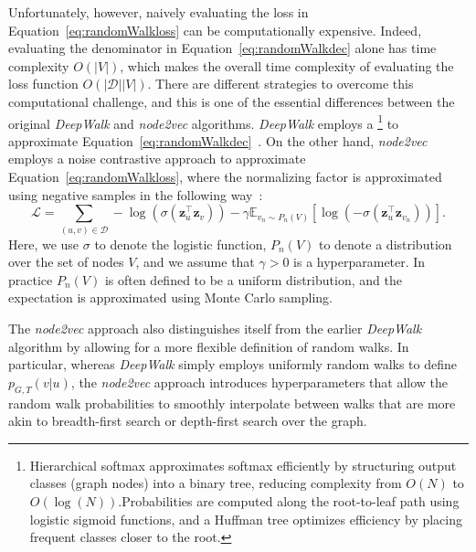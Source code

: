 Unfortunately, however, naively evaluating the loss in Equation~\eqref{eq:randomWalkloss} can be computationally expensive. Indeed, evaluating the denominator in Equation~\eqref{eq:randomWalkdec} alone has time complexity $O(|V|)$, which makes the overall time complexity of evaluating the loss function $O(|\mathcal{D}||V|)$. There are different strategies to overcome this computational challenge, and this is one of the essential differences between the original \textit{DeepWalk} and \textit{node2vec} algorithms. \textit{DeepWalk} employs a \footnote{Hierarchical softmax approximates softmax efficiently by structuring output classes (graph nodes) into a binary tree, reducing complexity from $O(N)$ to $O(\log(N))$.Probabilities are computed along the root-to-leaf path using logistic sigmoid functions, and a Huffman tree optimizes efficiency by placing frequent classes closer to the root.} to approximate Equation~\eqref{eq:randomWalkdec}~\cite{Perozzi2014DeepWalk}. On the other hand, \textit{node2vec} employs a noise contrastive approach to approximate Equation~\eqref{eq:randomWalkloss}, where the normalizing factor is approximated using negative samples in the following way~\cite{Grover2016node2vec}:
\begin{equation}\label{eq:node2vecLoss}
    \mathcal{L} = \sum_{(u,v)\in\mathcal{D}} -\log(\sigma(\mathbf{z}_u^\top\mathbf{z}_v)) - \gamma\mathbb{E}_{v_n\sim P_n(V)}[\log(-\sigma(\mathbf{z}_u^\top\mathbf{z}_{v_n}))].
\end{equation}
Here, we use $\sigma$ to denote the logistic function, $P_n(V)$ to denote a distribution over the set of nodes $V$, and we assume that $\gamma > 0$ is a hyperparameter. In practice $P_n(V)$ is often defined to be a uniform distribution, and the expectation is approximated using Monte Carlo sampling.

The \textit{node2vec} approach also distinguishes itself from the earlier \textit{DeepWalk} algorithm by allowing for a more flexible definition of random walks. In particular, whereas \textit{DeepWalk} simply employs uniformly random walks to define $p_{G,T}(v|u)$, the \textit{node2vec} approach introduces hyperparameters that allow the random walk probabilities to smoothly interpolate between walks that are more akin to breadth-first search or depth-first search over the graph.

